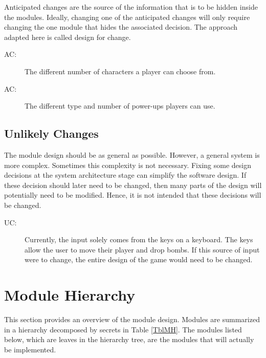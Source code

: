 \documentclass[12pt, titlepage]{article}
\newcounter{acnum}
\newcommand{\actheacnum}{AC\theacnum}
\newcounter{ucnum}
\newcommand{\uctheucnum}{UC\theucnum}
\begin{document}
Anticipated changes are the source of the information that is to be hidden
inside the modules. Ideally, changing one of the anticipated changes will only
require changing the one module that hides the associated decision. The approach
adapted here is called design for
change.

\begin{description}
\item[ \actheacnum \label{acPlayers}:] The different number of characters a player can choose from.
\item[ \actheacnum \label{acPower}:] The different type and number of power-ups players can use.

\end{description}

\subsection{Unlikely Changes} \label{SecUchange}

The module design should be as general as possible. However, a general system is
more complex. Sometimes this complexity is not necessary. Fixing some design
decisions at the system architecture stage can simplify the software design. If
these decision should later need to be changed, then many parts of the design
will potentially need to be modified. Hence, it is not intended that these
decisions will be changed.

\begin{description}
\item[ \uctheucnum \label{ucIO}:] 
Currently, the input solely comes from the keys on a keyboard. The keys allow the user to move their player and drop bombs. If this source of input were to change, the entire design of the game would need to be changed.  

\end{description}

\section{Module Hierarchy} \label{SecMH}

This section provides an overview of the module design. Modules are summarized
in a hierarchy decomposed by secrets in Table \ref{TblMH}. The modules listed
below, which are leaves in the hierarchy tree, are the modules that will
actually be implemented.
\end{document}
